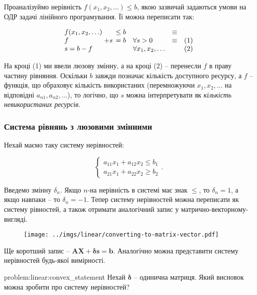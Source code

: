 \documentclass[\main/book.tex]{subfiles}
\begin{document}
Проаналізуймо нерівність $f(x_1, x_2, \ldots) \leq b$, якою зазвичай задаються умови на ОДР задачі лінійного програмування. Її можна переписати так:
 
\[
  \begin{array}{l@{\;}rllr}
   f(x_1, x_2, \ldots) &  \leq b  &                          & \equiv & \\
   f                   & + s\,= b & \forall s > 0            & \equiv & \text{(1)} \\
   s = b - f           &          & \forall x_1, x_2, \ldots &        & \text{(2)}
  \end{array}
 \]

На кроці (1) ми ввели люзову змінну, а на кроці (2) -- перенесли $f$ в праву частину рівняння. Оскільки $b$ завжди позначає кількість доступного ресурсу, а $f$ -- функція, що обраховує кількість використаних (перемножуючи $x_1, x_2, \ldots$ на відповідні $a_{n1}, a_{n2}, \ldots$), то логічно, що $s$ можна інтерпретувати як \textit{кількість невикористаних ресурсів}.

\subsubsection{Система рівнянь з люзовими змінними}

Нехай маємо таку систему нерівностей:

\[
 \left\{
  \begin{array}{l}
   a_{11} x_1 + a_{12} x_2 \leq b_1 \\
   a_{21} x_1 + a_{22} x_2 \geq b_2
  \end{array}
 \right. .
\]

Введемо змінну $\delta_n$. Якщо $n$-на нерівність в системі має знак \flqq{}$\leq$\frqq{}, то $\delta_n=1$, а якщо навпаки -- то $\delta_n=-1$. Тепер систему нерівностей можна переписати як систему рівностей, а також отримати аналогічний запис у матрично-векторному-вигляді.

\begin{figure}[!h]
 \center
 \texttt{[image: ../imgs/linear/converting-to-matrix-vector.pdf]}
\end{figure}

Ще коротший запис -- $\mathbf{A} \mathbf{X} + \mathbf{\delta} \mathbf{s} = \mathbf{b}$. Аналогічно можна представити систему нерівностей будь-якої вимірності.

\begin{problem}{problem:linear:convex_statement}
 Нехай $\mathbf{\delta}$ -- одинична матриця. Який висновок можна зробити про систему нерівностей?
\end{problem}
\end{document}
